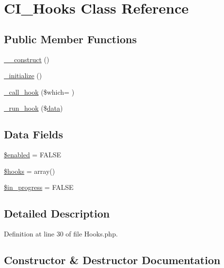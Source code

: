 \hypertarget{class_c_i___hooks}{}\section{C\+I\+\_\+\+Hooks Class Reference}
\label{class_c_i___hooks}
\subsection*{Public Member Functions}
\begin{DoxyCompactItemize}
\item 
\hyperlink{class_c_i___hooks_a095c5d389db211932136b53f25f39685}{\+\_\+\+\_\+construct} ()
\item 
\hyperlink{class_c_i___hooks_aa4239198c895a9c8c1ea86753ed49095}{\+\_\+initialize} ()
\item 
\hyperlink{class_c_i___hooks_a0bf8e0fb33a2ccf6e11b16d64c856d77}{\+\_\+call\+\_\+hook} (\$which= \textquotesingle{}\textquotesingle{})
\item 
\hyperlink{class_c_i___hooks_a2cd07b3fcfaf153a37f164d3fbc7c3d9}{\+\_\+run\+\_\+hook} (\$\hyperlink{components_2_ossn_comments_2actions_2comment_2edit_8php_a2b67189b42ab547221cb2a6408f4746a}{data})
\end{DoxyCompactItemize}
\subsection*{Data Fields}
\begin{DoxyCompactItemize}
\item 
\hyperlink{class_c_i___hooks_a8d376199cc641e3e7af6e1a0d5c736d9}{\$enabled} = F\+A\+L\+SE
\item 
\hyperlink{class_c_i___hooks_a05aec88c3516c6db5da524fbcc673aff}{\$hooks} = array()
\item 
\hyperlink{class_c_i___hooks_a716cd4dd6525620af7e3f514582b1438}{\$in\+\_\+progress} = F\+A\+L\+SE
\end{DoxyCompactItemize}


\subsection{Detailed Description}


Definition at line 30 of file Hooks.\+php.



\subsection{Constructor \& Destructor Documentation}
